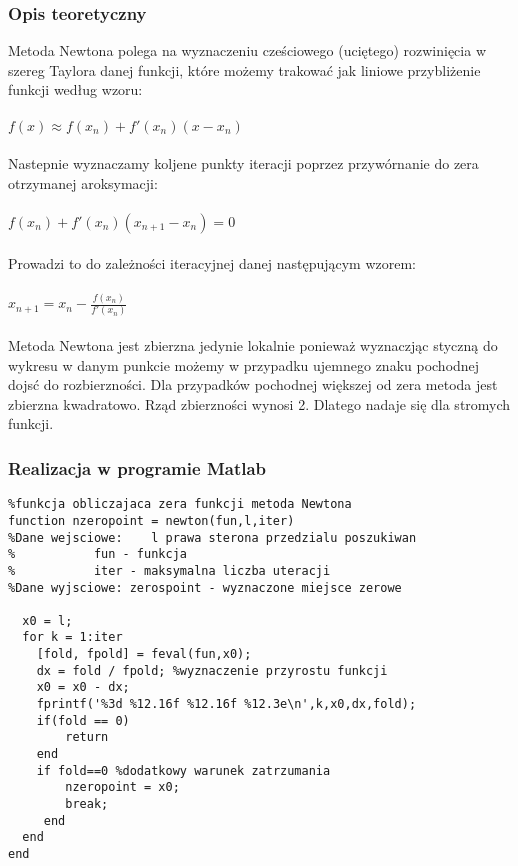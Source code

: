 \documentclass[a4paper, 11pt]{article}
\begin{document}
\subsubsection{Opis teoretyczny}
Metoda Newtona polega na wyznaczeniu cześciowego (uciętego) rozwinięcia w szereg Taylora danej funkcji, które możemy trakować jak liniowe przybliżenie funkcji według wzoru:\\
\\
$f(x) \approx f(x_{n})+f'(x_{n})(x-x_{n})$\\
\\
Nastepnie wyznaczamy koljene punkty iteracji poprzez przywórnanie do zera otrzymanej aroksymacji:\\
\\
$f(x_{n})+f'(x_{n})(x_{n+1}-x_{n}) = 0$\\
\\
Prowadzi to do zależności iteracyjnej danej następującym wzorem:\\
\\
$x_{n+1} = x_{n}-\frac{f(x_{n})}{f'(x_{n})}$\\
\\
Metoda Newtona jest zbierzna jedynie lokalnie ponieważ wyznaczjąc styczną do wykresu w danym punkcie możemy w przypadku ujemnego znaku pochodnej dojsć do rozbierzności. Dla przypadków pochodnej większej od zera metoda jest zbierzna kwadratowo. Rząd zbierzności wynosi 2. Dlatego nadaje się dla stromych funkcji. 

\subsubsection{Realizacja w programie Matlab}
\begin{lstlisting}
%funkcja obliczajaca zera funkcji metoda Newtona
function nzeropoint = newton(fun,l,iter)
%Dane wejsciowe:	l prawa sterona przedzialu poszukiwan
%			fun - funkcja 
%			iter - maksymalna liczba uteracji
%Dane wyjsciowe: zerospoint - wyznaczone miejsce zerowe
    
  x0 = l; 
  for k = 1:iter
    [fold, fpold] = feval(fun,x0); 
    dx = fold / fpold; %wyznaczenie przyrostu funkcji
    x0 = x0 - dx;
    fprintf('%3d %12.16f %12.16f %12.3e\n',k,x0,dx,fold);
    if(fold == 0)
        return
    end
	if fold==0 %dodatkowy warunek zatrzumania
        nzeropoint = x0;
        break; 
     end
  end
end
\end{lstlisting}
\end{document}
